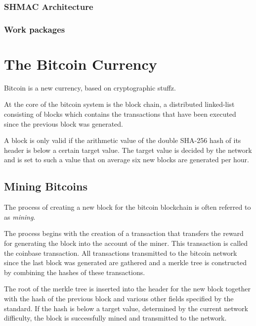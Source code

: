 \subsubsection{SHMAC Architecture}

\subsubsection{Work packages}


\section{The Bitcoin Currency}
\label{sec:bitcoins}

Bitcoin is a new currency, based on cryptographic stuffz.

At the core of the bitcoin system is the block chain, a distributed linked-list consisting of blocks
which contains the transactions that have been executed since the previous block was generated.

A block is only valid if the arithmetic value of the double SHA-256 hash of its header is below
a certain target value. The target value is decided by the network and is set to such a value that
on average six new blocks are generated per hour. \cite{bitcoin}

\subsection{Mining Bitcoins}
\label{sec:bitcoin-mining}

The process of creating a new block for the bitcoin blockchain is often referred to as \textit{mining}.

The process begins with the creation of a transaction that transfers the reward for generating the block
into the account of the miner. This transaction is called the coinbase transaction. All transactions
transmitted to the bitcoin network since the last block was generated are gathered and a merkle tree
is constructed by combining the hashes of these transactions.

The root of the merkle tree is inserted into the header for the new block together with the hash of the
previous block and various other fields specified by the standard. If the hash is below a target value,
determined by the current network difficulty, the block is successfully mined and transmitted to the
network.
